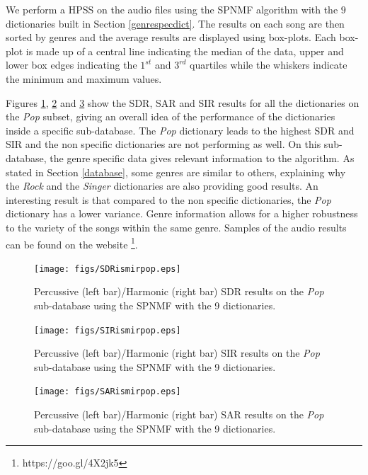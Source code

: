 \documentclass{article}
\begin{document}
We perform a HPSS on the audio files using the SPNMF algorithm with the $9$ dictionaries built in Section \ref{genrespecdict}. The results on each song are then sorted by genres and the average results are displayed using box-plots. Each box-plot is made up of a central line indicating the median of the data, upper and lower box edges indicating the $1^{st}$ and $3^{rd}$ quartiles while the whiskers indicate the minimum and maximum values. 


Figures \ref{sdrpop}, \ref{sirpop} and \ref{sarpop} show the SDR, SAR and SIR results for all the dictionaries on the \emph{Pop} subset, giving an overall idea of the performance of the dictionaries inside a specific sub-database. The \emph{Pop} dictionary leads to the highest SDR and SIR and the non specific dictionaries are not performing as well. On this sub-database, the genre specific data gives relevant information to the algorithm. As stated in Section \ref{database}, some genres are similar to others, explaining why the \emph{Rock} and the \emph{Singer} dictionaries are also providing good results. 
An interesting result is that compared to the non specific dictionaries, the \emph{Pop} dictionary has a lower variance. Genre information allows for a higher robustness to the variety of the songs within the same genre. Samples of the audio results can be found on the website \footnote{https://goo.gl/4X2jk5}.



\begin{figure}[h]

  \centering 
  \texttt{[image: figs/SDRismirpop.eps]}
  \caption{\label{sdrpop} Percussive (left bar)/Harmonic (right bar) SDR results on the \emph{Pop} sub-database using the SPNMF with the 9 dictionaries.}
  
\end{figure}\begin{figure}[h]

  \centering 
  \texttt{[image: figs/SIRismirpop.eps]}
  \caption{\label{sirpop} Percussive (left bar)/Harmonic (right bar) SIR results on the \emph{Pop} sub-database using the SPNMF with the 9 dictionaries.}
  
\end{figure}\begin{figure}[h]

  \centering 
  \texttt{[image: figs/SARismirpop.eps]}
  \caption{\label{sarpop} Percussive (left bar)/Harmonic (right bar) SAR results on the \emph{Pop} sub-database using the SPNMF with the 9 dictionaries.}
  
\end{figure}
\end{document}
